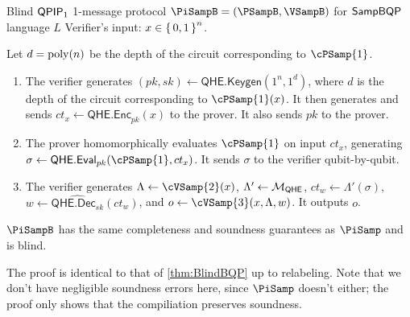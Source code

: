 \begin{protocol}{Blind $\operatorname{\mathsf{QPIP}}_1$ 1-message protocol $\PiSampB = (\PSampB, \VSampB)$ for $\operatorname{\mathsf{SampBQP}}$ language $L$}
	\label{proto:BlindSampBQP}
	Verifier's input: $x\in\set{0,1}^n$.
	
	Let $d=\operatorname*{\operatorname{poly}}(n)$ be the depth of the circuit corresponding to $\cPSamp{1}$.
	\begin{enumerate}
		\item The verifier generates $(pk, sk)\leftarrow\mathsf{QHE.Keygen}(1^n, 1^d)$, where $d$ is the depth of the circuit corresponding to $\cPSamp{1}(x)$.
			It then generates and sends $ct_x\leftarrow\mathsf{QHE.Enc}_{pk}(x)$ to the prover.
			It also sends $pk$ to the prover.
		\item The prover homomorphically evaluates $\cPSamp{1}$ on input $ct_x$, generating $\sigma\leftarrow\QEval_{pk}(\cPSamp{1}, ct_x)$.
			It sends $\sigma$ to the verifier qubit-by-qubit.
		\item The verifier generates $\Lambda\leftarrow\cVSamp{2}(x)$,
			$\Lambda'\leftarrow{\cal M}_{\mathsf{QHE}}$,
			$ct_w\leftarrow\Lambda'(\sigma)$,
			$w\leftarrow\widehat{\mathsf{QHE.Dec}_{sk}}(ct_w)$,
			and $o\leftarrow\cVSamp{3}(x, \Lambda, w)$.
			It outputs $o$.
	\end{enumerate}
\end{protocol}

\begin{thm}
	$\PiSampB$ has the same completeness and soundness guarantees as $\PiSamp$ and is blind.
\end{thm}
\begin{prf}
	The proof is identical to that of \cref{thm:BlindBQP} up to relabeling.
	Note that we don't have negligible soundness errors here, since $\PiSamp$ doesn't either; the proof only shows that the compiliation preserves soundness.
\end{prf}
